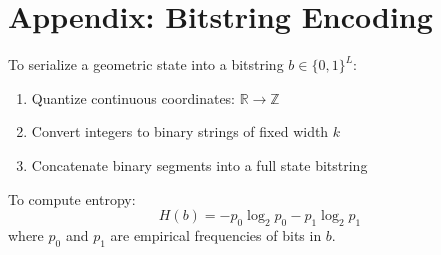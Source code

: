 \documentclass[11pt]{article}
\begin{document}
\section{Appendix: Bitstring Encoding}

To serialize a geometric state into a bitstring $b \in \{0,1\}^L$:
\begin{enumerate}
  \item Quantize continuous coordinates: $\mathbb{R} \to \mathbb{Z}$
  \item Convert integers to binary strings of fixed width $k$
  \item Concatenate binary segments into a full state bitstring
\end{enumerate}

To compute entropy:
\[
  H(b) = -p_0 \log_2 p_0 - p_1 \log_2 p_1
\]
where $p_0$ and $p_1$ are empirical frequencies of bits in $b$.

\printbibliography
\end{document}
